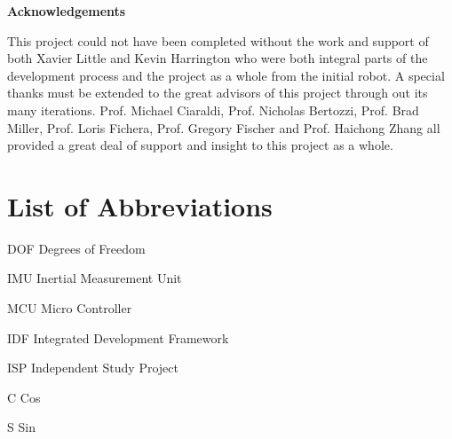 \documentclass[12pt]{report}
\begin{document}
\begin{center}
\hspace{2.75cm}
	\textbf{Acknowledgements}\newline
\end{center}
This project could not have been completed without the work and support of both Xavier Little and Kevin Harrington who were both integral parts of the development process and the project as a whole from the initial robot. A special thanks must be extended to the great advisors of this project through out its many iterations. Prof. Michael Ciaraldi, Prof. Nicholas Bertozzi, Prof. Brad Miller, Prof. Loris Fichera, Prof. Gregory Fischer and Prof. Haichong Zhang all provided a great deal of support and insight to this project as a whole.
\clearpage
\tableofcontents
\pagebreak
\listoffigures
\pagebreak
\listoftables
\pagebreak
\listofmyequations
\pagebreak
\chapter*{List of Abbreviations}
 
\begin{abbrv}
 
\item[DOF]			Degrees of Freedom
\item[IMU]          Inertial Measurement Unit
\item[MCU]          Micro Controller
\item[IDF]          Integrated Development Framework
\item[ISP]          Independent Study Project
\item[C]            Cos
\item[S]            Sin
\end{abbrv}

\clearpage

\setcounter{page}{1}

\end{document}
